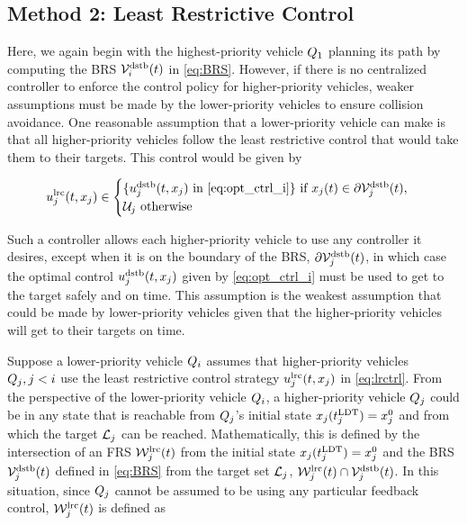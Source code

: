 \subsection{Method 2: Least Restrictive Control \label{sec:lrc}}
Here, we again begin with the highest-priority vehicle $Q_1$ planning its path by computing the BRS $\mathcal{V}_i^\text{dstb}(t)$ in \eqref{eq:BRS}. However, if there is no centralized controller to enforce the control policy for higher-priority vehicles, weaker assumptions must be made by the lower-priority vehicles to ensure collision avoidance. One reasonable assumption that a lower-priority vehicle can make is that all higher-priority vehicles follow the least restrictive control that would take them to their targets. This control would be given by 

\begin{equation}
\label{eq:lrctrl} %
\ctrl_j^\text{lrc}(t, \state_j)\in \begin{cases} \{\ctrl_j^\text{dstb}(t, \state_j) \text{ in } \eqref{eq:opt_ctrl_i}\} \text{ if } \state_j(t)\in \partial \brs_j^\text{dstb}(t), \\
\cset_j  \text{ otherwise}
\end{cases}
\end{equation}

Such a controller allows each higher-priority vehicle to use any controller it desires, except when it is on the boundary of the BRS, $\partial \mathcal{V}_j^\text{dstb}(t)$, in which case the optimal control $u_j^\text{dstb}(t, x_j)$ given by \eqref{eq:opt_ctrl_i} must be used to get to the target safely and on time. This assumption is the weakest assumption that could be made by lower-priority vehicles given that the higher-priority vehicles will get to their targets on time.

Suppose a lower-priority vehicle $Q_i$ assumes that higher-priority vehicles $Q_j, j < i$ use the least restrictive control strategy $u_j^\text{lrc}(t, x_j)$ in \eqref{eq:lrctrl}. From the perspective of the lower-priority vehicle $Q_i$, a higher-priority vehicle $Q_j$ could be in any state that is reachable from $Q_j$'s initial state $x_j(t^\text{LDT}_j) = x_{j}^0$ and from which the target $\mathcal{L}_j$ can be reached. Mathematically, this is defined by the intersection of an FRS $\mathcal{W}_j^\text{lrc}(t)$ from the initial state $x_j(t^\text{LDT}_j)=x_{j}^0$ and the BRS $\mathcal{V}_j^\text{dstb}(t)$ defined in \eqref{eq:BRS} from the target set $\mathcal{L}_j$, $\mathcal{W}_j^\text{lrc}(t) \cap \mathcal{V}_j^\text{dstb}(t)$. In this situation, since $Q_j$ cannot be assumed to be using any particular feedback control, $\mathcal{W}_j^\text{lrc}(t)$ is defined as

